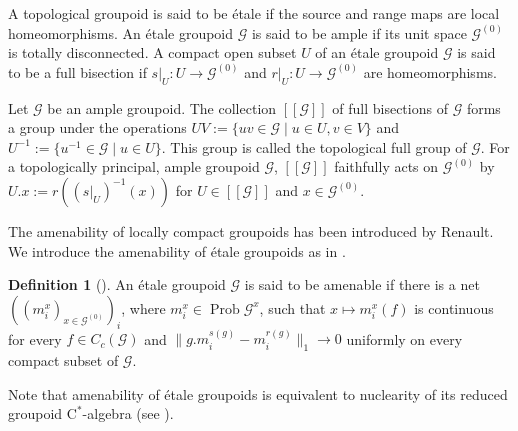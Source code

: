 \documentclass{amsart}
\newcommand{\G}{\mathcal{G}}
\newcommand{\Prob}[1]{\operatorname{Prob}{#1}}
\theoremstyle{remark}
\theoremstyle{definition}
\newtheorem*{definition}{Definition}
\begin{document}
A topological groupoid is said to be \'{e}tale if the source and range maps are local homeomorphisms.
An \'etale groupoid $\G$ is said to be ample if its unit space $\G^{(0)}$ is totally disconnected.
A compact open subset $U$ of an \'etale groupoid $\G$ is said to be a full bisection if $s|_U \colon U \to \G^{(0)}$ and $r|_U \colon U \to \G^{(0)}$ are homeomorphisms.

Let $\G$ be an ample groupoid.
The collection $[[ \G ]]$ of full bisections of $\G$ forms a group under the operations $UV := \{ uv \in \G \mid u \in U, v \in V \}$ and $U^{-1} := \{ u^{-1} \in \G \mid u \in U \}$.
This group is called the topological full group of $\G$.
For a topologically principal, ample groupoid $\G$, $[[ \G ]]$ faithfully acts on $\G^{(0)}$ by $U.x := r((s|_U)^{-1}(x))$ for $U \in [[ \G ]]$ and $x \in \G^{(0)}$.

The amenability of locally compact groupoids has been introduced by Renault.
We introduce the amenability of \'etale groupoids as in \cite{DelarocheRenault}.

\begin{definition}[\cite{DelarocheRenault}]
An \'etale groupoid $\G$ is said to be amenable if there is a net $((m_i^x)_{x \in \G^{(0)}})_i$, where $m_i^x \in \Prob{\G^x}$, such that $x \mapsto m_i^x(f)$ is continuous for every $f \in C_c (\G)$ and $\| g.m_i^{s(g)} - m_i^{r(g)} \|_1 \to 0$ uniformly on every compact subset of $\G$.
\end{definition}

Note that amenability of \'etale groupoids is equivalent to nuclearity of its reduced groupoid $\mathrm{C}^*$-algebra (see \cite[Theorem 5.6.18]{BrownOzawa}).
\end{document}
